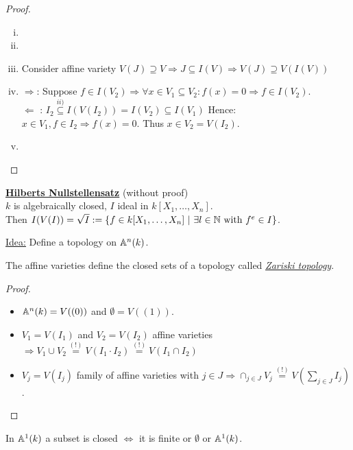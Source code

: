 
\begin{proof}
\begin{enumerate}[i)]
\item \checkmark
\item \checkmark
\item Consider affine variety $V(J)\supseteq V \Rightarrow J \subseteq I(V) \Rightarrow V(J)\supseteq V(I(V))$
\item \glqq $\Rightarrow$\grqq: Suppose $f \in I(V_2) \Rightarrow \forall x \in V_1 \subseteq V_2: f(x)=0 \Rightarrow f \in I(V_2)$.\\
\glqq $\Leftarrow$ \grqq: $I_2 \stackrel{ii)}{\subseteq} I(V(I_2))=I(V_2) \subseteq I(V_1)$ Hence: $x \in V_1, f \in I_2 \Rightarrow f(x)=0$. Thus $x \in V_2 =V(I_2)$.
\item \checkmark
\end{enumerate}
\end{proof}

\underline{\textbf{Hilberts Nullstellensatz}} (without proof)\\
$k$ is algebraically closed, $I$ ideal in $k[X_1, \dots, X_n]$.\\
Then $I(V(I))=\sqrt{I}:=\{f \in k[X_1, \dots, X_n] \ | \ \exists l \in \mathbb{N} \text{ with } f^e \in I\}$.\\
\vspace*{\baselineskip}

\underline{Idea:} Define a topology on $\mathbb{A}^n(k)$.

\begin{Bemdef}
The affine varieties define the closed sets of a topology called \emph{\underline{Zariski topology}}.
\end{Bemdef}

\begin{proof}
\begin{itemize}
\item $\mathbb{A}^n(k)=V((0))$ and $\emptyset=V((1))$.
\item $V_1=V(I_1)$ and $V_2=V(I_2)$ affine varieties $\Rightarrow V_1 \cup V_2 \stackrel{(!)}{=} V(I_1 \cdot I_2)\stackrel{(!)}{=}V(I_1 \cap I_2)$
\item $V_j=V(I_j)$ family of affine varieties with $j \in J \Rightarrow \cap_{j \in J} V_j \stackrel{(!)}{=} V(\sum_{j\in J} I_j)$.
\end{itemize}
\end{proof}

\begin{Bsp}
In $\mathbb{A}^1(k)$ a subset is closed $\iff$ it is finite or $\emptyset$ or $\mathbb{A}^1(k)$.
\end{Bsp}


